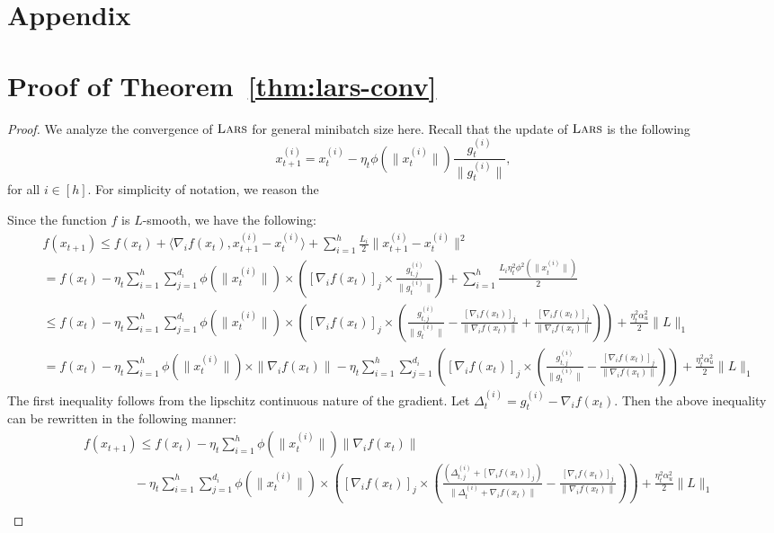 \section*{Appendix}

\section{Proof of Theorem~\ref{thm:lars-conv}}

\begin{proof}
We analyze the convergence of $\textsc{Lars}$ for general minibatch size here. Recall that the update of $\textsc{Lars}$  is the following
$$
x_{t+1}^{(i)}  = x_{t}^{(i)} - \eta_t \phi(\|x_t^{(i)}\|) \frac{g_{t}^{(i)}}{\|g_t^{(i)}\|},
$$
for all $i \in [h]$. For simplicity of notation, we reason the 

Since the function $f$ is $L$-smooth, we have the following:
\begin{align}
&f(x_{t+1}) \leq f(x_t) + \langle \nabla_i f(x_t), x_{t+1}^{(i)} - x_{t}^{(i)} \rangle + \sum_{i=1}^h \frac{L_i}{2} \|x_{t+1}^{(i)} - x_t^{(i)}\|^2 \nonumber \\
&= f(x_t) - \eta_t \sum_{i=1}^h \sum_{j=1}^{d_i}\phi(\|x_t^{(i)}\|)  \times \left( [\nabla_i f(x_t)]_j \times \frac{g_{t,j}^{(i)}}{\|g_{t}^{(i)}\|}  \right) + \sum_{i=1}^h \frac{L_i\eta_t^2 \phi^2(\|x_t^{(i)}\|)}{2} \nonumber \\
&\leq f(x_t) - \eta_t \sum_{i=1}^h \sum_{j=1}^{d_i}   \phi(\|x_t^{(i)}\|) \times \left( [\nabla_i f(x_t)]_j \times \left(\frac{g_{t,j}^{(i)}}{\|g_{t}^{(i)}\|} - \frac{[\nabla_i f(x_t)]_j}{\| \nabla_i f(x_t) \|} + \frac{[\nabla_i f(x_t)]_j}{\| \nabla_i f(x_t) \|} \right)  \right) + \frac{\eta_t^2  \alpha_u^2}{2} \| L\|_1 \nonumber \\
&= f(x_t) - \eta_t\sum_{i=1}^h  \phi(\|x_t^{(i)}\|) \times \|\nabla_i f(x_t)\| - \eta_t  \sum_{i=1}^h \sum_{j=1}^{d_i} \left( [\nabla_i f(x_t)]_j \times \left(\frac{g_{t,j}^{(i)}}{\|g_{t}^{(i)}\|} - \frac{[\nabla_i f(x_t)]_j}{\| \nabla_i f(x_t) \|} \right)  \right) + \frac{\eta_t^2 \alpha_u^2 }{2} \| L\|_1
\label{eq:lars-conv-eq1}
\end{align}
The first inequality follows from the lipschitz continuous nature of the gradient. Let $\Delta_{t}^{(i)} = g_{t}^{(i)} - \nabla_i f(x_t)$. Then the above inequality can be rewritten in the following manner:
\begin{align}
&f(x_{t+1}) \leq f(x_t) - \eta_t \sum_{i=1}^h \phi(\|x_t^{(i)}\|)  \|\nabla_i f(x_t)\| \nonumber \\
& \qquad \qquad - \eta_t  \sum_{i=1}^h \sum_{j=1}^{d_i} \phi(\|x_t^{(i)}\|) \times  \left( [\nabla_i f(x_t)]_j \times \left(\frac{(\Delta_{t,j}^{(i)} + [\nabla_i f(x_t)]_j)}{\|\Delta_{t}^{(i)} + \nabla_i f(x_t)\|} - \frac{[\nabla_i f(x_t)]_j}{\| \nabla_i f(x_t) \|} \right)  \right) + \frac{\eta_t^2 \alpha_u^2}{2} \| L\|_1 \nonumber \\

\end{align}
\end{proof}
